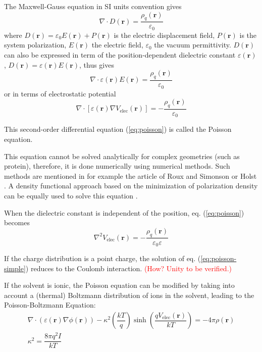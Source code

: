 The Maxwell-Gauss equation in SI units convention gives 
\begin{equation}
\nabla\cdot D(\mathbf{r})=\dfrac{\rho_{q}(\mathbf{r})}{\varepsilon_{0}}
\end{equation}
where $D(\mathbf{r})=\varepsilon_{0}E(\mathbf{r})+P(\mathbf{r})$
is the electric displacement field, $P(\mathbf{r})$ is the system
polarization, $E(\mathbf{r})$ the electric field, $\varepsilon_{0}$
the vacuum permittivity. $D(\mathbf{r})$ can also be expressed in
term of the position-dependent dielectric constant $\varepsilon(\mathbf{r})$,
$D(\mathbf{r})=\varepsilon(\mathbf{r})E(\mathbf{r})$, thus gives
\begin{equation}
\nabla\cdot\varepsilon(\mathbf{r})E(\mathbf{r})=\dfrac{\rho_{q}(\mathbf{r})}{\varepsilon_{0}}
\end{equation}
or in terms of electrostatic potential 
\begin{equation}
\nabla\cdot\left[\varepsilon(\mathbf{r})\nabla V_{\mathrm{elec}}(\mathbf{r})\right]=-\dfrac{\rho_{q}(\mathbf{r})}{\varepsilon_{0}}\label{eq:poisson}
\end{equation}


This second-order differential equation (\ref{eq:poisson}) is called
the Poisson equation. 

This equation cannot be solved analytically for complex geometries
(such as protein), therefore, it is done numerically using numerical
methods. Such methods are mentioned in for example the article of
Roux and Simonson \citep{roux_implicit_1999} or Holst \citep{holst_1994_poisson}.
A density functional approach based on the minimization of polarization
density can be equally used to solve this equation \citep{Marchi_2001,Levy_2005}.

When the dielectric constant is independent of the position, eq. (\ref{eq:poisson})
becomes
\begin{equation}
\nabla^{2}V_{\mathrm{elec}}(\mathbf{r})=-\dfrac{\rho_{q}(\mathbf{r})}{\varepsilon_{0}\varepsilon}\label{eq:poisson-simple}
\end{equation}


If the charge distribution is a point charge, the solution of eq.
(\ref{eq:poisson-simple}) reduces to the Coulomb interaction. \textcolor{red}{(How?
Unity to be verified.)}

If the solvent is ionic, the Poisson equation can be modified by taking
into account a (thermal) Boltzmann distribution of ions in the solvent,
leading to the Poisson-Boltzmann Equation:
\begin{equation}
\begin{array}{r}
\nabla\cdot(\varepsilon(\mathbf{r})\nabla\phi(\mathbf{r}))-\kappa^{2}\left(\dfrac{kT}{q}\right)\sinh\left(\dfrac{qV_{\mathrm{elec}}(\mathbf{r})}{kT}\right)=-4\pi\rho(\mathbf{r})\\
\kappa^{2}=\dfrac{8\pi q^{2}I}{kT}
\end{array}
\end{equation}


